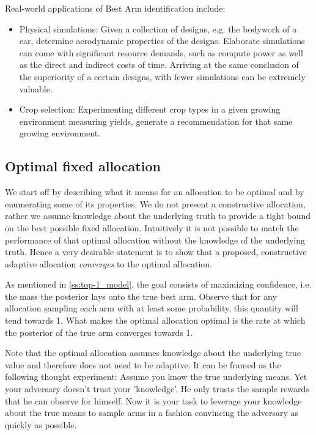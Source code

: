 Real-world applications of Best Arm identification include:
\begin{itemize}
  \item Physical simulations: Given a collection of designs, e.g. the bodywork
  of a car, determine aerodynamic properties of the designs. Elaborate
  simulations can come with significant resource demands, such as compute power
  as well as the direct and indirect costs of time. Arriving at the same
  conclusion of the superiority of a certain designs, with fewer simulations can
  be extremely valuable.
  \item Crop selection: Experimenting different crop types in a given growing
  environment measuring yields, generate a recommendation for that same growing
  environment.
\end{itemize}


\subsection{Optimal fixed allocation}\label{subsection:optimal_allocation}

We start off by describing what it means for an allocation to be optimal and by
enumerating some of its properties. We do not present a constructive allocation,
rather we assume knowledge about the underlying truth to provide a tight bound
on the best possible fixed allocation. Intuitively it is not possible to match
the performance of that optimal allocation without the knowledge of the
underlying truth. Hence a very desirable statement is to show that a proposed,
constructive adaptive allocation \emph{converges} to the optimal allocation.

As mentioned in \ref{ss:top-1_model}, the goal consists of maximizing
confidence, i.e. the mass the posterior lays onto the true best arm. Observe
that for any allocation sampling each arm with at least some probability, this
quantity will tend towards 1. What makes the optimal allocation optimal is the
rate at which the posterior of the true arm converges towards 1.

Note that the optimal allocation assumes knowledge about the underlying true
value and therefore does not need to be adaptive. It can be framed as the
following thought experiment: Assume you know the true underlying means. Yet
your adversary doesn't trust your 'knowledge'. He only trusts the sample rewards
that he can observe for himself. Now it is your task to leverage your knowledge
about the true means to sample arms in a fashion convincing the adversary as
quickly as possible.

